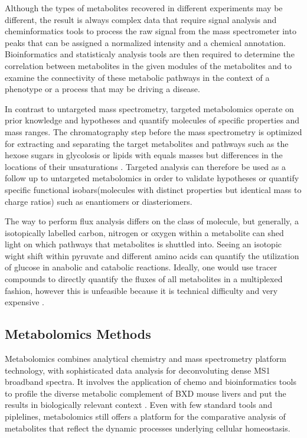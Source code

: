 \documentclass[a4paper,11pt,twoside]{book}
\begin{document}
    Although the types of metabolites recovered in different experiments may be different, the result is always complex data that require signal analysis and cheminformatics tools to process the raw signal from the mass spectrometer into peaks that can be assigned a normalized intensity and a chemical annotation. Bioinformatics and statisticaly analysis tools are then required to determine the correlation between metabolites in the given modules of the metabolites and to examine the connectivity of these metabolic pathways in the context of a phenotype or a process that may be driving a disease\citep{Aksenov2017GlobalSpectrometry}.
	
	In contrast to untargeted mass spectrometry, targeted metabolomics operate on prior knowledge and hypotheses and quantify molecules of specific properties and mass ranges. The chromatography step before the mass spectrometry is optimized for extracting and separating the target metabolites and pathways such as the hexose sugars in glycolosis or lipids with equals masses but differences in the locations of their unsaturations \citep{Cani2009}. Targeted analysis can therefore be used as a follow up to untargeted metabolomics in order to validate hypotheses or quantify specific functional isobars(molecules with distinct  properties but identical mass to charge ratios) such as enantiomers or diasteriomers.
	
	The way to perform flux analysis differs on the class of molecule, but generally, a isotopically labelled carbon, nitrogen or oxygen within a metabolite can shed light on which pathways that metabolites is shuttled into\citep{Zamboni200913C-basedAnalysis}. Seeing an isotopic wight shift within pyruvate and different amino acids can quantify the utilization of glucose in anabolic and catabolic reactions. Ideally, one would use tracer compounds to directly quantify the fluxes of all metabolites in a multiplexed fashion, however this is unfeasible because it is technical difficulty and very expensive \citep{Zamboni200913C-basedAnalysis}. 
	
	
	\subsection{Metabolomics Methods}
	
	Metabolomics combines analytical chemistry and mass spectrometry platform technology, with sophisticated data analysis for deconvoluting dense MS1 broadband spectra. It involves the application of chemo and bioinformatics tools to profile the diverse metabolic complement of BXD mouse livers and put the results in biologically relevant context \citep{Coen2010}. Even with few standard tools and piplelines, metabolomics still offers a platform for the comparative analysis of metabolites that reflect the dynamic processes underlying cellular homeostasis\citep{Aksenov2017GlobalSpectrometry}.
	
\end{document}
